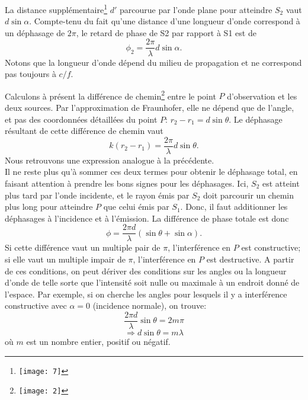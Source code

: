 La distance supplémentaire\footnote{\texttt{[image: 7]}} $d'$ parcourue par l'onde plane pour atteindre $S_2$ vaut $d\sin\alpha$. Compte-tenu du fait qu'une distance d'une longueur d'onde correspond à un déphasage de $2\pi$, le retard de phase de S2 par rapport à S1 est de 
$$ \phi_2=\frac{2\pi}{\lambda}d\sin\alpha.$$ 
Notons que la longueur d'onde dépend du milieu de propagation et ne correspond pas toujours à $c/f$.

Calculons à présent la différence de chemin\footnote{
\texttt{[image: 2]}} entre le point $P$ d'observation et les deux sources. Par l'approximation de Fraunhofer, elle ne dépend que de l'angle, et pas des coordonnées détaillées du point $P$: $r_2-r_1=d\sin\theta$.
Le déphasage résultant de cette différence de chemin vaut 
$$k(r_2-r_1)=\frac{2\pi}{\lambda}d\sin\theta.$$ 
Nous retrouvons une expression analogue à la précédente.\\

Il ne reste plus qu'à sommer ces deux termes pour obtenir le déphasage total, en faisant attention à prendre les bons signes pour les déphasages. Ici, $S_2$ est atteint plus tard par l'onde incidente, et le rayon émis par $S_2$ doit parcourir un chemin plus long pour atteindre $P$ que celui émis par $S_1$. Donc, il faut additionner les déphasages à l'incidence et à l'émission. La différence de phase totale est donc 
$$\phi=\frac{2\pi d}{\lambda}(\sin \theta +\sin \alpha).$$
Si cette différence vaut un multiple pair de $\pi$, l'interférence en $P$ est constructive; si elle vaut un multiple impair de $\pi$, l'interférence en $P$ est destructive. A partir de ces conditions, on peut dériver des conditions sur les angles ou la longueur d'onde de telle sorte que l'intensité soit nulle ou maximale à un endroit donné de l'espace. Par exemple, si on cherche les angles pour lesquels il y a interférence constructive avec $\alpha=0$ (incidence normale), on trouve: 
$$ \frac{2\pi d}{\lambda}\sin \theta=2m\pi$$
$$ \Rightarrow d \sin \theta =m\lambda$$
 où $m$ est un nombre entier, positif ou négatif. \\
 
